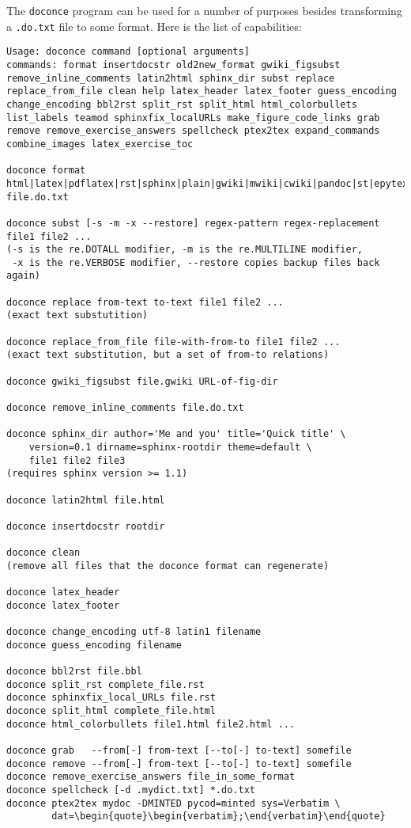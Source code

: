 \documentclass[twoside]{article}
\begin{document}
The {\fontsize{10pt}{10pt}\verb!doconce!} program can be used for a number of purposes besides
transforming a {\fontsize{10pt}{10pt}\verb!.do.txt!} file to some format. Here is the
list of capabilities:

\begin{Verbatim}
Usage: doconce command [optional arguments]
commands: format insertdocstr old2new_format gwiki_figsubst remove_inline_comments latin2html sphinx_dir subst replace replace_from_file clean help latex_header latex_footer guess_encoding change_encoding bbl2rst split_rst split_html html_colorbullets list_labels teamod sphinxfix_localURLs make_figure_code_links grab remove remove_exercise_answers spellcheck ptex2tex expand_commands combine_images latex_exercise_toc

doconce format html|latex|pdflatex|rst|sphinx|plain|gwiki|mwiki|cwiki|pandoc|st|epytext file.do.txt

doconce subst [-s -m -x --restore] regex-pattern regex-replacement file1 file2 ...
(-s is the re.DOTALL modifier, -m is the re.MULTILINE modifier,
 -x is the re.VERBOSE modifier, --restore copies backup files back again)

doconce replace from-text to-text file1 file2 ...
(exact text substutition)

doconce replace_from_file file-with-from-to file1 file2 ...
(exact text substitution, but a set of from-to relations)

doconce gwiki_figsubst file.gwiki URL-of-fig-dir

doconce remove_inline_comments file.do.txt

doconce sphinx_dir author='Me and you' title='Quick title' \
    version=0.1 dirname=sphinx-rootdir theme=default \
    file1 file2 file3
(requires sphinx version >= 1.1)

doconce latin2html file.html

doconce insertdocstr rootdir

doconce clean
(remove all files that the doconce format can regenerate)

doconce latex_header
doconce latex_footer

doconce change_encoding utf-8 latin1 filename
doconce guess_encoding filename

doconce bbl2rst file.bbl
doconce split_rst complete_file.rst
doconce sphinxfix_local_URLs file.rst
doconce split_html complete_file.html
doconce html_colorbullets file1.html file2.html ...

doconce grab   --from[-] from-text [--to[-] to-text] somefile
doconce remove --from[-] from-text [--to[-] to-text] somefile
doconce remove_exercise_answers file_in_some_format
doconce spellcheck [-d .mydict.txt] *.do.txt
doconce ptex2tex mydoc -DMINTED pycod=minted sys=Verbatim \
        dat=\begin{quote}\begin{verbatim};\end{verbatim}\end{quote}


\end{Verbatim}
\end{document}
